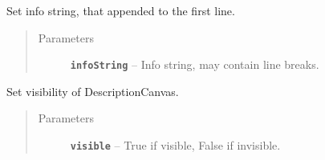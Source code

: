 \documentclass[a4paper,10pt,english]{sphinxmanual}
\begin{document}
\begin{fulllineitems}
\begin{fulllineitems}
\label{model_link:model.AbstractItem.DescriptionCanvas.setCanvasString}
Set info string, that appended to the first line.
\begin{quote}\begin{description}
\item[{Parameters}] \leavevmode
\textbf{\texttt{infoString}} -- Info string, may contain line breaks.

\end{description}\end{quote}

\end{fulllineitems}


\begin{fulllineitems}
\label{model_link:model.AbstractItem.DescriptionCanvas.setVisibility}
Set visibility of DescriptionCanvas.
\begin{quote}\begin{description}
\item[{Parameters}] \leavevmode
\textbf{\texttt{visible}} -- True if visible, False if invisible.

\end{description}\end{quote}

\end{fulllineitems}


\end{fulllineitems}


\begin{fulllineitems}
\label{model_link:model.AbstractItem.bin_}
\end{fulllineitems}


\begin{fulllineitems}
\label{model_link:model.AbstractItem.hex_}
\end{fulllineitems}
\end{document}
